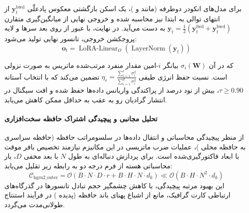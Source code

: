 برای مدل‌های انکودر دوطرفه (مانند  و )، یک اسکن بازگشتی معکوس پادعلّی $\mathbf{y}_t^{\text{bwd}}$ از انتهای توالی به ابتدا نیز محاسبه شده و خروجی نهایی از میانگین‌گیری متقارن $\mathbf{y}_t = \frac{1}{2}(\mathbf{y}_t^{\text{fwd}} + \mathbf{y}_t^{\text{bwd}})$ به دست می‌آید. در نهایت، با عبور از  روی بعد سرها و لایه پروجکشن خروجی، تانسور نهایی تولید می‌شود:
\begin{equation}
\mathbf{o}_t = \operatorname{LoRA-Linear}_O\left( \operatorname{LayerNorm}(\mathbf{y}_t) \right)
\end{equation}

که در آن $\sigma_i(\mathbf{W})$ بیانگر $i$-امین مقدار منفرد مرتب‌شده ماتریس به صورت نزولی است. نسبت حفظ انرژی طیفی $\eta_r = \frac{\sum_{i=1}^r \sigma_i^2}{\sum_{i=1}^{d} \sigma_i^2}$ تضمین می‌کند که با انتخاب آستانه $\tau \ge 0.90$، بیش از نود درصد از پراکندگی واریانس داده‌ها حفظ شده و افت سیگنال در انتشار گرادیان رو به عقب به حداقل ممکن کاهش می‌یابد.

\paragraph{تحلیل مجانبی و پیچیدگی اشتراک حافظه سخت‌افزاری}
از منظر پیچیدگی محاسباتی و انتقال داده‌ها در سلسومراتب حافظه (حافظه سراسری  به حافظه محلی )، عملیات ضرب ماتریسی در این مکانیزم نیازمند تخصیص بافر موقت با ابعاد فاکتورگیری‌شده است. برای پردازش دنباله‌ای به طول $N$ با بعد مخفی $D$، بار محاسباتی هسته از فرم درجه دو به رابطه زیر تقلیل می‌یابد:
\begin{equation}
\label{eq:complexity_hgrn2_outer}
\mathcal{C}_{\text{hgrn2\_outer}} = \mathcal{O}\left( B \cdot N \cdot D \cdot r + B \cdot H \cdot N \cdot d_k \right) \ll \mathcal{O}\left( B \cdot H \cdot N^2 \cdot d_k \right)
\end{equation}
این بهبود مرتبه پیچیدگی، با کاهش چشمگیر حجم تبادل تانسورها در گذرگاه‌های ارتباطی کارت گرافیک، مانع از اشباع پهنای باند حافظه (پدیده ) در فرآیند استنتاج طولانی‌مدت می‌گردد.

